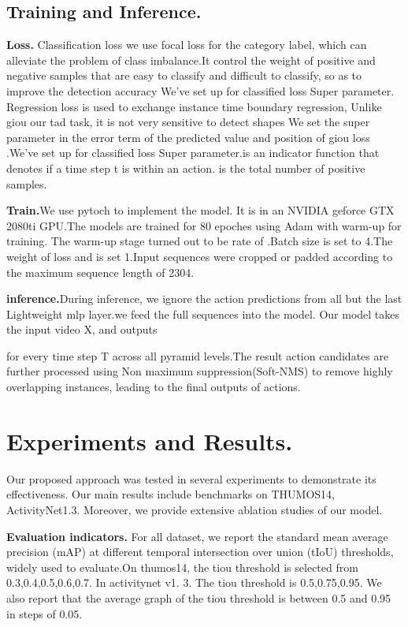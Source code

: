 \documentclass[10pt,twocolumn,letterpaper]{article}
\begin{document}
\subsection{Training and Inference.}
\textbf{Loss.}
Classification loss we use focal loss\cite{lin2017focal} for the category label, which can alleviate the problem of class imbalance.It control the weight of positive and negative samples that are easy to classify and difficult to classify, so as to improve the detection accuracy
We've set up for classified loss  Super parameter.
Regression loss is used to exchange instance time boundary regression, Unlike giou\cite{rezatofighi2019generalized} our tad task, it is not very sensitive to detect shapes We set the super parameter in the error term of the predicted value and position of giou loss .We've set up for classified loss  Super parameter.is an indicator function that denotes if a time step t is within an action. is the total number of positive samples.



\textbf{Train.}We use pytoch to implement the model. It is in an NVIDIA geforce GTX 2080ti GPU.The models are trained for 80 epoches using Adam with warm-up for training. The warm-up stage turned out to be rate of .Batch size is set to 4.The weight of loss  and  is set 1.Input sequences were cropped or padded according to the maximum sequence length of 2304.

\textbf{inference.}During inference, we ignore the action predictions from all but the last Lightweight mlp layer.we feed the full sequences
into the model. Our model takes the input video X, and outputs 

for every time step T across all pyramid
levels.The result action candidates are further processed
using Non maximum suppression(Soft-NMS)\cite{bodla2017soft} to remove highly overlapping instances,
leading to the final outputs of actions.

\section{Experiments and Results.}
Our proposed approach was tested in several experiments to demonstrate its effectiveness. Our main results include benchmarks on THUMOS14\cite{THUMOS14}, ActivityNet1.3\cite{caba2015activitynet}. Moreover, we provide extensive ablation studies of our model.

\textbf{Evaluation indicators.} 
For all dataset, we report the standard
mean average precision (mAP) at different temporal intersection over union (tIoU) thresholds, widely used to evaluate.On thumos14, the tiou threshold is selected from {0.3,0.4,0.5,0.6,0.7}. In activitynet v1. 3. The tiou threshold is {0.5,0.75,0.95}. We also report that the average graph of the tiou threshold is between 0.5 and 0.95 in steps of 0.05. 
\end{document}
